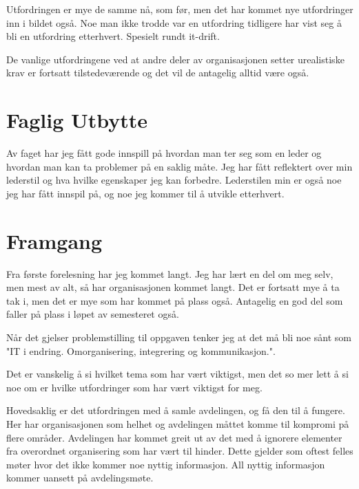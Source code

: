 \documentclass[12pt, a4paper]{article}
\begin{document}
Utfordringen er mye de samme nå, som før, men det har kommet nye utfordringer
inn i bildet også. Noe man ikke trodde var en utfordring tidligere har vist seg
å bli en utfordring etterhvert. Spesielt rundt it-drift. 

De vanlige utfordringene ved at andre deler av organisasjonen setter
urealistiske krav er fortsatt tilstedeværende og det vil de antagelig alltid
være også.  

\section{Faglig Utbytte}
Av faget har jeg fått gode innspill på hvordan man ter seg som en leder og
hvordan man kan ta problemer på en saklig måte. Jeg har fått reflektert over
min lederstil og hva hvilke egenskaper jeg kan forbedre. Lederstilen min er
også noe jeg har fått innspil på, og noe jeg kommer til å utvikle etterhvert. 

\section{Framgang}
Fra første forelesning har jeg kommet langt. Jeg har lært en del om meg selv,
men mest av alt, så har organisasjonen kommet langt. Det er fortsatt mye å ta
tak i, men det er mye som har kommet på plass også. Antagelig en god del som
faller på plass i løpet av semesteret også. 

Når det gjelser problemstilling til oppgaven tenker jeg at det må bli noe sånt
som "IT i endring. Omorganisering, integrering og kommunikasjon.".

Det er vanskelig å si hvilket tema som har vært viktigst, men det so mer lett å
si noe om er hvilke utfordringer som har vært viktigst for meg.

Hovedsaklig er det utfordringen med å samle avdelingen, og få den til å
fungere. Her har organisasjonen som helhet og avdelingen måttet komme til
kompromi på flere områder. Avdelingen har kommet greit ut av det med å ignorere
elementer fra overordnet organisering som har vært til hinder. Dette gjelder
som oftest felles møter hvor det ikke kommer noe nyttig informasjon. All nyttig
informasjon kommer uansett på avdelingsmøte. 
\end{document}

